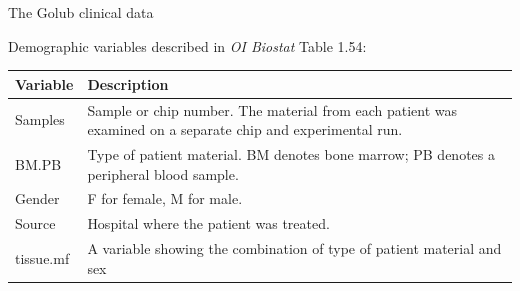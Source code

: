 \documentclass[
  ignorenonframetext,
]{beamer}
\begin{document}
\begin{frame}{The Golub clinical data}
\protect\hypertarget{the-golub-clinical-data}{}

Demographic variables described in \emph{OI Biostat} Table 1.54:

\scriptsize

\begin{longtable}[]{@{}ll@{}}
\toprule
\begin{minipage}[b]{0.12\columnwidth}\raggedright
Variable\strut
\end{minipage} & \begin{minipage}[b]{0.82\columnwidth}\raggedright
Description\strut
\end{minipage}\tabularnewline
\midrule
\endhead
\begin{minipage}[t]{0.12\columnwidth}\raggedright
Samples\strut
\end{minipage} & \begin{minipage}[t]{0.82\columnwidth}\raggedright
Sample or chip number. The material from each patient was examined on a
separate chip and experimental run.\strut
\end{minipage}\tabularnewline
\begin{minipage}[t]{0.12\columnwidth}\raggedright
BM.PB\strut
\end{minipage} & \begin{minipage}[t]{0.82\columnwidth}\raggedright
Type of patient material. BM denotes bone marrow; PB denotes a
peripheral blood sample.\strut
\end{minipage}\tabularnewline
\begin{minipage}[t]{0.12\columnwidth}\raggedright
Gender\strut
\end{minipage} & \begin{minipage}[t]{0.82\columnwidth}\raggedright
F for female, M for male.\strut
\end{minipage}\tabularnewline
\begin{minipage}[t]{0.12\columnwidth}\raggedright
Source\strut
\end{minipage} & \begin{minipage}[t]{0.82\columnwidth}\raggedright
Hospital where the patient was treated.\strut
\end{minipage}\tabularnewline
\begin{minipage}[t]{0.12\columnwidth}\raggedright
tissue.mf\strut
\end{minipage} & \begin{minipage}[t]{0.82\columnwidth}\raggedright
A variable showing the combination of type of patient material and sex

\end{minipage}
\end{longtable}
\end{frame}
\end{document}
